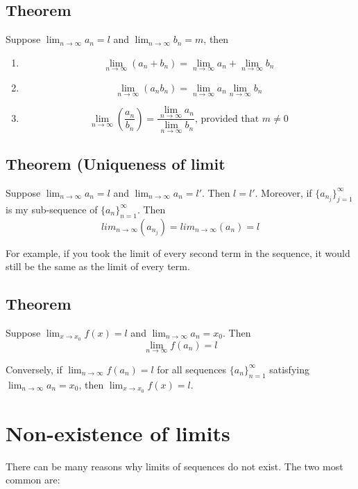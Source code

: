 \documentclass[11pt]{article}
\begin{document}
\subsection*{Theorem}
Suppose $\lim_{n\rightarrow\infty} a_n = l$ and $\lim_{n\rightarrow\infty} b_n = m$, then
\begin{enumerate}
\item \[ \lim_{n\rightarrow\infty} \left( a_n + b_n \right) = \lim_{n\rightarrow\infty} a_n + \lim_{n\rightarrow\infty} b_n\]

\item \[ \lim_{n\rightarrow\infty} \left( a_n b_n \right) = \lim_{n\rightarrow\infty} a_n \lim_{n\rightarrow\infty} b_n\]

\item \[ \lim_{n\rightarrow\infty} \left( \frac{a_n}{b_n} \right) = \frac{\lim_{n\rightarrow\infty} a_n}{\lim_{n\rightarrow\infty} b_n} \text{, provided that } m\neq0 \] 
\end{enumerate}

\subsection*{Theorem (Uniqueness of limit}
Suppose $\lim_{n\rightarrow\infty} a_n = l$ and $\lim_{n\rightarrow\infty} a_n = l'$. Then $l=l'$. Moreover, if $\{a_{n_j}\}_{j=1}^\infty$ is my sub-sequence of $\{a_n\}_{n=1}^\infty$. 
Then
\[ lim_{n\rightarrow\infty} \left( a_{n_j} \right) = lim_{n\rightarrow\infty} \left( a_n \right) =l \]

For example, if you took the limit of every second term in the sequence, it would still be the same as the limit of every term.

\subsection*{Theorem}
Suppose $\lim_{x\rightarrow x_0}f(x)=l$ and $\lim_{n\rightarrow\infty}a_n=x_0$. Then
\[ \lim_{n\rightarrow\infty}f(a_n)=l \]

Conversely, if $\lim_{n\rightarrow\infty}f(a_n) = l$ for all sequences $\{a_n\}_{n=1}^\infty$ satisfying $\lim_{n\rightarrow\infty}a_n=x_0$, then $\lim_{x\rightarrow x_0}f(x)=l$.

\section{Non-existence of limits}
There can be many reasons why limits of sequences do not exist. The two most common are:
\end{document}
